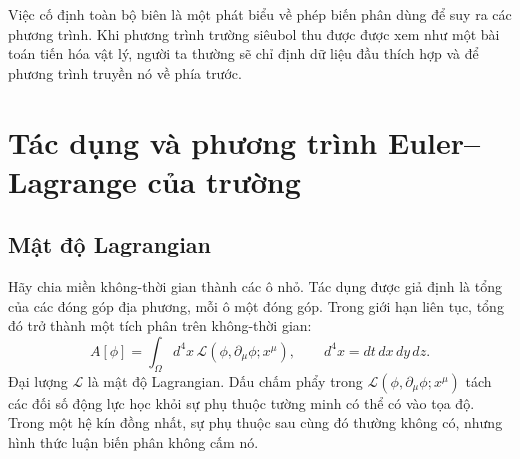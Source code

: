 \begin{classroomqa}
\end{classroomqa}

\begin{classroomqa}
\end{classroomqa}

Việc cố định toàn bộ biên là một phát biểu về phép biến phân dùng để suy ra các phương trình. Khi phương trình trường siêubol thu được được xem như một bài toán tiến hóa vật lý, người ta thường sẽ chỉ định dữ liệu đầu thích hợp và để phương trình truyền nó về phía trước.

\section{Tác dụng và phương trình Euler--Lagrange của trường}

\subsection{Mật độ Lagrangian}

Hãy chia miền không-thời gian thành các ô nhỏ. Tác dụng được giả định là tổng của các đóng góp địa phương, mỗi ô một đóng góp. Trong giới hạn liên tục, tổng đó trở thành một tích phân trên không-thời gian:
\begin{equation}
A[\phi]
=
\int_{\Omega} d^4x\,
\mathcal{L}\!\left(
\phi,\partial_\mu\phi;x^\mu
\right),
\qquad
d^4x=dt\,dx\,dy\,dz.
\label{eq:sr4-field-action}
\end{equation}
Đại lượng \(\mathcal{L}\) là mật độ Lagrangian. Dấu chấm phẩy trong \(\mathcal{L}(\phi,\partial_\mu\phi;x^\mu)\) tách các đối số động lực học khỏi sự phụ thuộc tường minh có thể có vào tọa độ. Trong một hệ kín đồng nhất, sự phụ thuộc sau cùng đó thường không có, nhưng hình thức luận biến phân không cấm nó.

